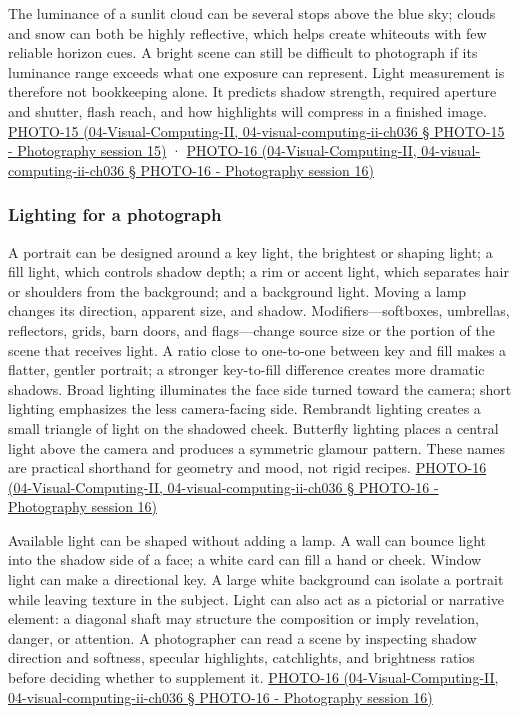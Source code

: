 The luminance of a sunlit cloud can be several stops above the blue sky; clouds and snow can both be highly reflective, which helps create whiteouts with few reliable horizon cues. A bright scene can still be difficult to photograph if its luminance range exceeds what one exposure can represent. Light measurement is therefore not bookkeeping alone. It predicts shadow strength, required aperture and shutter, flash reach, and how highlights will compress in a finished image. \href{}{PHOTO-15 (04-Visual-Computing-II, 04-visual-computing-ii-ch036 § PHOTO-15 - Photography session 15)} · \href{}{PHOTO-16 (04-Visual-Computing-II, 04-visual-computing-ii-ch036 § PHOTO-16 - Photography session 16)}

\subsubsection{Lighting for a photograph}\label{lighting-for-a-photograph}

A portrait can be designed around a key light, the brightest or shaping light; a fill light, which controls shadow depth; a rim or accent light, which separates hair or shoulders from the background; and a background light. Moving a lamp changes its direction, apparent size, and shadow. Modifiers---softboxes, umbrellas, reflectors, grids, barn doors, and flags---change source size or the portion of the scene that receives light. A ratio close to one-to-one between key and fill makes a flatter, gentler portrait; a stronger key-to-fill difference creates more dramatic shadows. Broad lighting illuminates the face side turned toward the camera; short lighting emphasizes the less camera-facing side. Rembrandt lighting creates a small triangle of light on the shadowed cheek. Butterfly lighting places a central light above the camera and produces a symmetric glamour pattern. These names are practical shorthand for geometry and mood, not rigid recipes. \href{}{PHOTO-16 (04-Visual-Computing-II, 04-visual-computing-ii-ch036 § PHOTO-16 - Photography session 16)}

Available light can be shaped without adding a lamp. A wall can bounce light into the shadow side of a face; a white card can fill a hand or cheek. Window light can make a directional key. A large white background can isolate a portrait while leaving texture in the subject. Light can also act as a pictorial or narrative element: a diagonal shaft may structure the composition or imply revelation, danger, or attention. A photographer can read a scene by inspecting shadow direction and softness, specular highlights, catchlights, and brightness ratios before deciding whether to supplement it. \href{}{PHOTO-16 (04-Visual-Computing-II, 04-visual-computing-ii-ch036 § PHOTO-16 - Photography session 16)}

